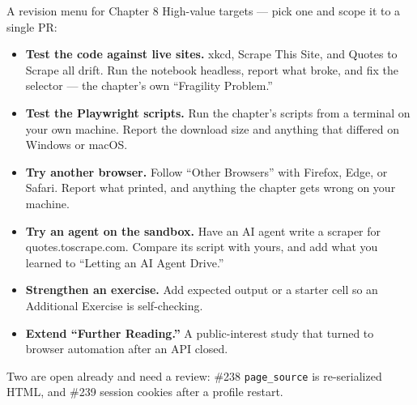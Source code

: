\documentclass[9pt,aspectratio=169]{beamer}
\begin{document}
\begin{frame}{A revision menu for Chapter 8}
    High-value targets --- pick one and scope it to a single PR:
    \begin{itemize}
        \item \textbf{Test the code against live sites.} xkcd, Scrape This Site, and Quotes to Scrape all drift. Run the notebook headless, report what broke, and fix the selector --- the chapter's own ``Fragility Problem.''
        \item \textbf{Test the Playwright scripts.} Run the chapter's scripts from a terminal on your own machine. Report the download size and anything that differed on Windows or macOS.
        \item \textbf{Try another browser.} Follow ``Other Browsers'' with Firefox, Edge, or Safari. Report what printed, and anything the chapter gets wrong on your machine.
        \item \textbf{Try an agent on the sandbox.} Have an AI agent write a scraper for quotes.toscrape.com. Compare its script with yours, and add what you learned to ``Letting an AI Agent Drive.''
        \item \textbf{Strengthen an exercise.} Add expected output or a starter cell so an Additional Exercise is self-checking.
        \item \textbf{Extend ``Further Reading.''} A public-interest study that turned to browser automation after an API closed.
    \end{itemize}

    \smallskip

    {\footnotesize Two are open already and need a review: \#238 \texttt{page\_source} is re-serialized HTML, and \#239 session cookies after a profile restart.}

\end{frame}
\end{document}
